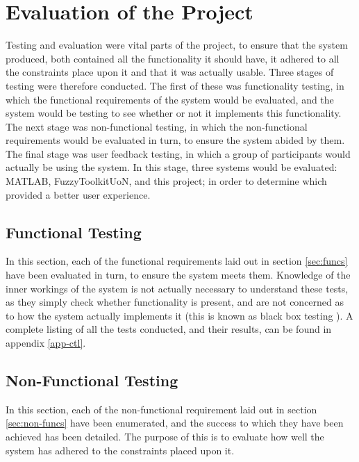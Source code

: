 \section{Evaluation of the Project}
Testing and evaluation were vital parts of the project, to ensure that the system produced, both contained all the functionality it should have, it adhered to all the constraints place upon it and that it was actually usable. Three stages of testing were therefore conducted. The first of these was functionality testing, in which the functional requirements of the system would be evaluated, and the system would be testing to see whether or not it implements this functionality. The next stage was non-functional testing, in which the non-functional requirements would be evaluated in turn, to ensure the system abided by them. The final stage was user feedback testing, in which a group of participants would actually be using the system. In this stage, three systems would be evaluated: MATLAB, FuzzyToolkitUoN, and this project; in order to determine which provided a better user experience.

\subsection{Functional Testing}
In this section, each of the functional requirements laid out in section \ref{sec:funcs} have been evaluated in turn, to ensure the system meets them. Knowledge of the inner workings of the system is not actually necessary to understand these tests, as they simply check whether functionality is present, and are not concerned as to how the system actually implements it (this is known as black box testing \cite{beizer1995black}). A complete listing of all the tests conducted, and their results, can be found in appendix \ref{app-ctl}.

\subsection{Non-Functional Testing}
In this section, each of the non-functional requirement laid out in section \ref{sec:non-funcs} have been enumerated, and the success to which they have been achieved has been detailed. The purpose of this is to evaluate how well the system has adhered to the constraints placed upon it.

